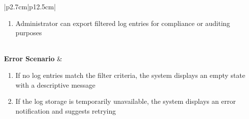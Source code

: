 \begin{table}[H]
\begin{tabular}{|p{2.7cm}|p{12.5cm}|}
\begin{minipage}[t]{\linewidth}
\begin{enumerate}[topsep=0pt,itemsep=1pt,parsep=0pt,partopsep=0pt]
                                          \item Administrator can export filtered log entries for compliance or auditing
                                                purposes
                                      \end{enumerate}
                                  \end{minipage}                                                     \\ \hline
        \textbf{Error Scenario} & \begin{minipage}[t]{\linewidth}
                                      \begin{enumerate}[topsep=0pt,itemsep=1pt,parsep=0pt,partopsep=0pt]
                                          \item If no log entries match the filter criteria, the system displays an empty state
                                                with a descriptive message
                                          \item If the log storage is temporarily unavailable, the system displays an error
                                                notification and suggests retrying
                                      \end{enumerate}
                                  \end{minipage}                                                    \\ \hline
    \end{tabular}
    \label{tab:admin-activity-logs}
\end{table}
